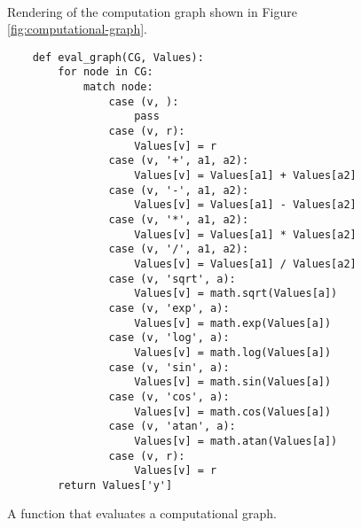 \begin{figure}[!ht]
\centering
{} \
\vspace*{-0.3cm}
\caption{Rendering of the computation graph shown in Figure \ref{fig:computational-graph}.}
\label{fig:cg.eps}
\end{figure}

\begin{figure}[!ht]
\centering
\begin{verbatim}
    def eval_graph(CG, Values):
        for node in CG:
            match node:
                case (v, ):
                    pass
                case (v, r):
                    Values[v] = r
                case (v, '+', a1, a2):
                    Values[v] = Values[a1] + Values[a2]
                case (v, '-', a1, a2):
                    Values[v] = Values[a1] - Values[a2]
                case (v, '*', a1, a2):
                    Values[v] = Values[a1] * Values[a2]
                case (v, '/', a1, a2):
                    Values[v] = Values[a1] / Values[a2]
                case (v, 'sqrt', a):
                    Values[v] = math.sqrt(Values[a])            
                case (v, 'exp', a):
                    Values[v] = math.exp(Values[a])
                case (v, 'log', a):
                    Values[v] = math.log(Values[a])
                case (v, 'sin', a):
                    Values[v] = math.sin(Values[a])
                case (v, 'cos', a):
                    Values[v] = math.cos(Values[a])
                case (v, 'atan', a):
                    Values[v] = math.atan(Values[a])
                case (v, r):
                    Values[v] = r
        return Values['y']
\end{verbatim}
\vspace*{-0.3cm}
\caption{A function that evaluates a computational graph.}
\label{fig:Reverse-Mode-AD.ipynb:eval_graph}
\end{figure}

